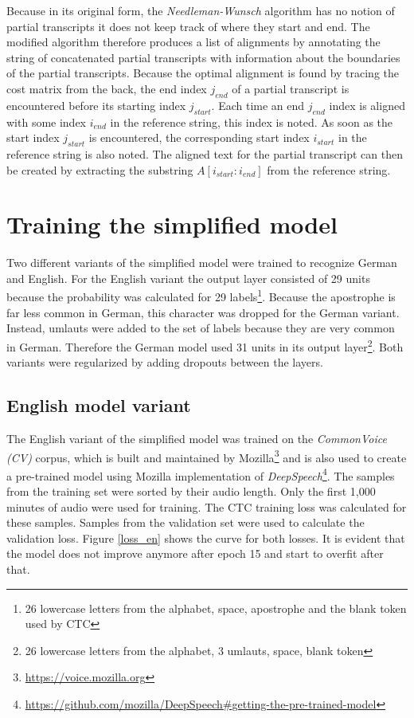 \documentclass[letterpaper]{article}
\begin{document}
Because in its original form, the \textit{Needleman-Wunsch} algorithm has no notion of partial transcripts it does not keep track of where they start and end. The modified algorithm therefore produces a list of alignments by annotating the string of concatenated partial transcripts with information about the boundaries of the partial transcripts. Because the optimal alignment is found by tracing the cost matrix from the back, the end index $j_{end}$ of a partial transcript is encountered before its starting index $j_{start}$. Each time an end $j_{end}$ index is aligned with some index $i_{end}$ in the reference string, this index is noted. As soon as the start index $j_{start}$ is encountered, the corresponding start index $i_{start}$ in the reference string is also noted. The aligned text for the partial transcript can then be created by extracting the substring $A[i_{start} : i_{end}]$ from the reference string.

\section{Training the simplified model}

Two different variants of the simplified model were trained to recognize German and English. For the English variant the output layer consisted of 29 units because the probability was calculated for 29 labels\footnote{26 lowercase letters from the alphabet, space, apostrophe and the blank token used by CTC}. Because the apostrophe is far less common in German, this character was dropped for the German variant. Instead, umlauts were added to the set of labels because they are very common in German. Therefore the German model used 31 units in its output layer\footnote{26 lowercase letters from the alphabet, 3 umlauts, space, blank token}. Both variants were regularized by adding dropouts between the layers.

\subsection{English model variant}
The English variant of the simplified model was trained on the \textit{CommonVoice (CV)} corpus, which is built and maintained by Mozilla\footnote{\url{https://voice.mozilla.org}} and is also used to create a pre-trained model using Mozilla implementation of \textit{DeepSpeech}\footnote{\url{https://github.com/mozilla/DeepSpeech#getting-the-pre-trained-model}}. The samples from the training set were sorted by their audio length. Only the first 1,000 minutes of audio were used for training. The CTC training loss was calculated for these samples. Samples from the validation set were used to calculate the validation loss. Figure \ref{loss_en} shows the curve for both losses. It is evident that the model does not improve anymore after epoch 15 and start to overfit after that.
\end{document}
